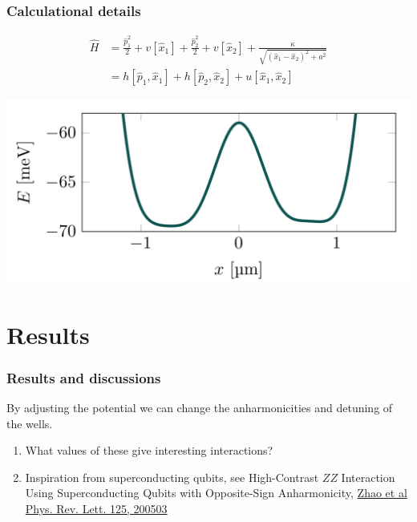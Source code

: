 \documentclass{beamer}
\begin{document}
\begin{frame}
\frametitle{Calculational details}

\begin{align}
\hat{H} &= \frac{\hat{p}_1^2}{2} + v[\hat{x}_1] + \frac{\hat{p}_2^2}{2} + v[\hat{x}_2] + \frac{\kappa}{\sqrt{(\hat{x}_1-\hat{x}_2)^2 + a^2}}\\
&= h[\hat{p}_1,\hat{x}_1] + h[\hat{p}_2,\hat{x}_2] + u[\hat{x}_1,\hat{x}_2]
\end{align}

\vspace{6mm}

\centerline{\includegraphics[width=0.8\linewidth]{qcfigures/wells.png}}

\vspace{6mm}
\end{frame}

\section{Results}



\begin{frame}
\frametitle{Results and discussions}

By adjusting the potential we can change the anharmonicities and detuning of the wells.
\begin{enumerate}
\item What values of these give interesting interactions?

\item Inspiration from superconducting qubits, see High-Contrast $ZZ$ Interaction Using Superconducting Qubits with Opposite-Sign Anharmonicity, \href{{https://journals.aps.org/prl/abstract/10.1103/PhysRevLett.125.200503}}{Zhao et al Phys. Rev. Lett. 125, 200503}
\end{enumerate}

\noindent
\end{frame}
\end{document}
